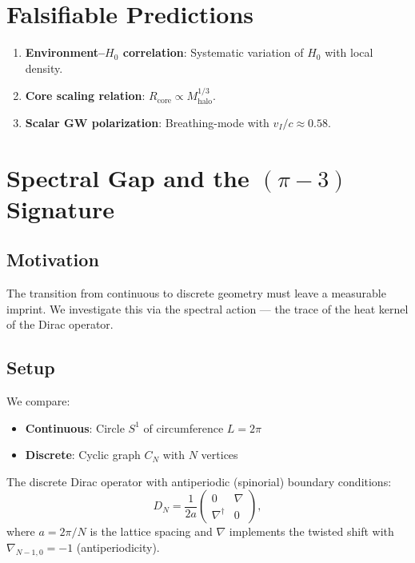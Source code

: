 \documentclass[12pt, a4paper]{article}
\begin{document}

\section{Falsifiable Predictions}

\begin{enumerate}
    \item \textbf{Environment--$H_0$ correlation}: Systematic variation of $H_0$ with local density.
    \item \textbf{Core scaling relation}: $R_{\text{core}} \propto M_{\text{halo}}^{1/3}$.
    \item \textbf{Scalar GW polarization}: Breathing-mode with $v_I/c \approx 0.58$.
\end{enumerate}


\section{Spectral Gap and the $(\pi - 3)$ Signature}

\subsection{Motivation}

The transition from continuous to discrete geometry must leave a measurable imprint. We investigate this via the spectral action --- the trace of the heat kernel of the Dirac operator.

\subsection{Setup}

We compare:
\begin{itemize}
    \item \textbf{Continuous}: Circle $S^1$ of circumference $L = 2\pi$
    \item \textbf{Discrete}: Cyclic graph $C_N$ with $N$ vertices
\end{itemize}

The discrete Dirac operator with antiperiodic (spinorial) boundary conditions:
\begin{equation}
    D_N = \frac{1}{2a}\begin{pmatrix} 0 & \nabla \\ \nabla^\dagger & 0 \end{pmatrix},
\end{equation}
where $a = 2\pi/N$ is the lattice spacing and $\nabla$ implements the twisted shift with $\nabla_{N-1,0} = -1$ (antiperiodicity).
\end{document}
